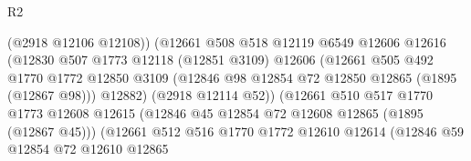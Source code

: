 \begin{lexlean}{R2}
\begin{coremodule}
                                        (@2918 @12106 @12108))
                                      (@12661
                                        @508
                                        @518
                                        @12119
                                        @6549
                                        @12606
                                        @12616
                                        (@12830
                                          @507
                                          @1773
                                          @12118
                                          (@12851 @3109)
                                          @12606
                                          (@12661
                                            @505
                                            @492
                                            @1770
                                            @1772
                                            @12850
                                            @3109
                                            (@12846
                                              @98
                                              @12854
                                              @72
                                              @12850
                                              @12865
                                              (@1895 (@12867 @98)))
                                            @12882)
                                          (@2918 @12114 @52))
                                        (@12661
                                          @510
                                          @517
                                          @1770
                                          @1773
                                          @12608
                                          @12615
                                          (@12846 @45 @12854 @72 @12608 @12865 (@1895 (@12867 @45)))
                                          (@12661
                                            @512
                                            @516
                                            @1770
                                            @1772
                                            @12610
                                            @12614
                                            (@12846
                                              @59
                                              @12854
                                              @72
                                              @12610
                                              @12865

\end{coremodule}
\end{lexlean}
